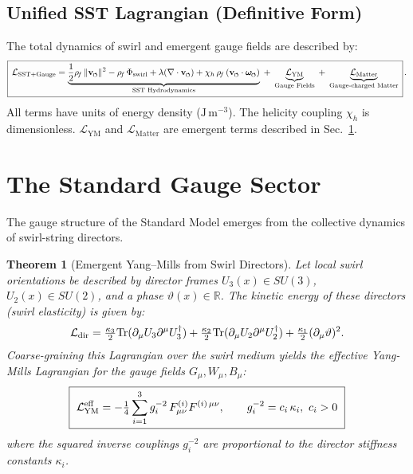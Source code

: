 \documentclass[11pt]{article}
\newcommand{\Tr}{\mathrm{Tr}}
\newcommand{\swirlarrow}{%
    \mathchoice{\mkern-2mu\scriptstyle\boldsymbol{\circlearrowleft}}%
    {\mkern-2mu\scriptstyle\boldsymbol{\circlearrowleft}}%
    {\mkern-2mu\scriptscriptstyle\boldsymbol{\circlearrowleft}}%
    {\mkern-2mu\scriptscriptstyle\boldsymbol{\circlearrowleft}}%
}
\newcommand{\vswirl}{\mathbf{v}_{\swirlarrow}}
\newcommand{\omegas}{\boldsymbol{\omega}_{\swirlarrow}}  %
\newcommand{\rhof}{\rho_{\!f}}                           %
\newtheorem{theorem}{Theorem}[section]
\begin{document}
\subsection*{Unified SST Lagrangian (Definitive Form)}
    \label{sec:lagrangian}
    The total dynamics of swirl and emergent gauge fields are described by:
    \[
        \boxed{\,\mathcal{L}_{\text{SST+Gauge}}
            =
            \underbrace{\frac{1}{2}\rhof\,\|\vswirl\|^2
            - \rhof\,\Phi_{\text{swirl}}
                + \lambda(\nabla\cdot\vswirl)
                + \chi_h\,\rhof\,(\vswirl\cdot\omegas)}_{\text{SST Hydrodynamics}}
            \;+\;
            \underbrace{\mathcal{L}_{\text{YM}}}_{\text{Gauge Fields}}
            \;+\;
            \underbrace{\mathcal{L}_{\text{Matter}}}_{\text{Gauge-charged Matter}}
            \,}\,.
    \]
    All terms have units of energy density ($\mathrm{J\,m^{-3}}$). The helicity coupling $\chi_h$ is dimensionless. $\mathcal{L}_{\text{YM}}$ and $\mathcal{L}_{\text{Matter}}$ are emergent terms described in Sec.~\ref{sec:gauge_core}.

\section{The Standard Gauge Sector}
\label{sec:gauge_core}
The gauge structure of the Standard Model emerges from the collective dynamics of swirl-string directors.

\begin{theorem}[Emergent Yang–Mills from Swirl Directors]
Let local swirl orientations be described by director frames $U_3(x)\!\in\!SU(3)$, $U_2(x)\!\in\!SU(2)$, and a phase $\vartheta(x)\!\in\!\mathbb R$. The kinetic energy of these directors (swirl elasticity) is given by:
\[ \mathcal L_{\rm dir}=\tfrac{\kappa_3}{2}\Tr(\partial_\mu U_3\partial^\mu U_3^\dagger) +\tfrac{\kappa_2}{2}\Tr(\partial_\mu U_2\partial^\mu U_2^\dagger) +\tfrac{\kappa_1}{2}(\partial_\mu\vartheta)^2. \]
Coarse-graining this Lagrangian over the swirl medium yields the effective Yang-Mills Lagrangian for the gauge fields $G_\mu, W_\mu, B_\mu$:
\[ \boxed{\ \mathcal L_{\rm YM}^{\rm eff}=-\tfrac14\sum_{i=1}^3 g_i^{-2}\,F^{(i)}_{\mu\nu}F^{(i)\,\mu\nu},\qquad g_i^{-2}=c_i\,\kappa_i,\ c_i>0\ } \]
where the squared inverse couplings $g_i^{-2}$ are proportional to the director stiffness constants $\kappa_i$.
\end{theorem}
\end{document}
